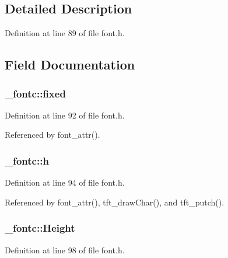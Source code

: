 \subsection{Detailed Description}


Definition at line 89 of file font.\-h.



\subsection{Field Documentation}
\hypertarget{struct__fontc_aec700f6ada95d1bced81fc2728633878}{
\subsubsection[{fixed}]{ \-\_\-fontc\-::fixed}}\label{struct__fontc_aec700f6ada95d1bced81fc2728633878}


Definition at line 92 of file font.\-h.



Referenced by font\-\_\-attr().

\hypertarget{struct__fontc_a9feb8c838dfc1d4eebb15c8e53981944}{
\subsubsection[{h}]{ \-\_\-fontc\-::h}}\label{struct__fontc_a9feb8c838dfc1d4eebb15c8e53981944}


Definition at line 94 of file font.\-h.



Referenced by font\-\_\-attr(), tft\-\_\-draw\-Char(), and tft\-\_\-putch().

\hypertarget{struct__fontc_a98f97c237dfb1027c38813a17ef6dcd6}{
\subsubsection[{Height}]{ \-\_\-fontc\-::\-Height}}\label{struct__fontc_a98f97c237dfb1027c38813a17ef6dcd6}


Definition at line 98 of file font.\-h.



